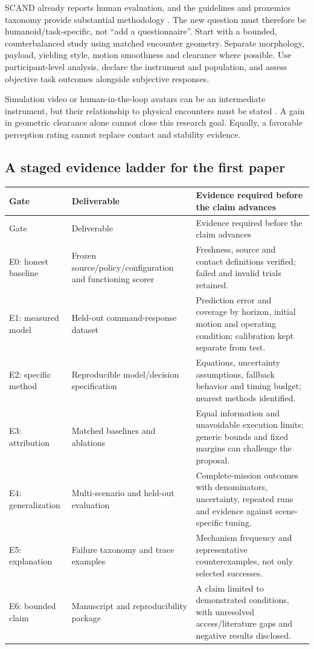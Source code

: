SCAND already reports human evaluation, and the guidelines and proxemics taxonomy
provide substantial methodology \citep{scand,guidelines,proxemics2026}. The new
question must therefore be humanoid/task-specific, not ``add a questionnaire''.
Start with a bounded, counterbalanced study using matched encounter geometry.
Separate morphology, payload, yielding style, motion smoothness and clearance
where possible. Use participant-level analysis, declare the instrument and
population, and assess objective task outcomes alongside subjective responses.

Simulation video or human-in-the-loop avatars can be an intermediate instrument,
but their relationship to physical encounters must be stated
\citep{habitat3}. A gain in geometric clearance alone cannot close this research
goal. Equally, a favorable perception rating cannot replace contact and stability
evidence.

\subsection{A staged evidence ladder for the first paper}
\begin{longtable}{P{0.13\textwidth}P{0.36\textwidth}P{0.43\textwidth}}
\toprule Gate & Deliverable & Evidence required before the claim advances \\
\midrule\endfirsthead
\toprule Gate & Deliverable & Evidence required before the claim advances \\
\midrule\endhead
\bottomrule\endfoot
E0: honest baseline & Frozen source/policy/configuration and functioning scorer & Freshness, source and contact definitions verified; failed and invalid trials retained. \\
E1: measured model & Held-out command-response dataset & Prediction error and coverage by horizon, initial motion and operating condition; calibration kept separate from test. \\
E2: specific method & Reproducible model/decision specification & Equations, uncertainty assumptions, fallback behavior and timing budget; nearest methods identified. \\
E3: attribution & Matched baselines and ablations & Equal information and unavoidable execution limits; generic bounds and fixed margins can challenge the proposal. \\
E4: generalization & Multi-scenario and held-out evaluation & Complete-mission outcomes with denominators, uncertainty, repeated runs and evidence against scene-specific tuning. \\
E5: explanation & Failure taxonomy and trace examples & Mechanism frequency and representative counterexamples, not only selected successes. \\
E6: bounded claim & Manuscript and reproducibility package & A claim limited to demonstrated conditions, with unresolved access/literature gaps and negative results disclosed. \\
\end{longtable}

